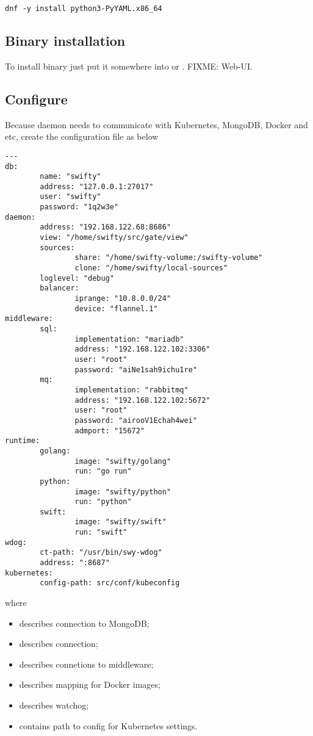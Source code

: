 \begin{lstlisting}
dnf -y install python3-PyYAML.x86_64
\end{lstlisting}

\subsection{Binary installation}
\label{subsec:setup-swifty-bin}

To install binary just put it somewhere into 
or . FIXME: Web-UI.

\subsection{Configure}
\label{subsec:setup-swifty-conf}

Because  daemon needs to communicate with Kubernetes,
MongoDB, Docker and etc, create the 
configuration file as below

\begin{lstlisting}
---
db:
        name: "swifty"
        address: "127.0.0.1:27017"
        user: "swifty"
        password: "1q2w3e"
daemon:
        address: "192.168.122.68:8686"
        view: "/home/swifty/src/gate/view"
        sources:
                share: "/home/swifty-volume:/swifty-volume"
                clone: "/home/swifty/local-sources"
        loglevel: "debug"
        balancer:
                iprange: "10.8.0.0/24"
                device: "flannel.1"
middleware:
        sql:
                implementation: "mariadb"
                address: "192.168.122.102:3306"
                user: "root"
                password: "aiNe1sah9ichu1re"
        mq:
                implementation: "rabbitmq"
                address: "192.168.122.102:5672"
                user: "root"
                password: "airooV1Echah4wei"
                admport: "15672"
runtime:
        golang:
                image: "swifty/golang"
                run: "go run"
        python:
                image: "swifty/python"
                run: "python"
        swift:
                image: "swifty/swift"
                run: "swift"
wdog:
        ct-path: "/usr/bin/swy-wdog"
        address: ":8687"
kubernetes:
        config-path: src/conf/kubeconfig
\end{lstlisting}

where
\begin{itemize}
\item{ describes connection to MongoDB;}
\item{ describes  connection;}
\item{ describes connetions to middleware;}
\item{ describes mapping for Docker images;}
\item{ describes  watchog;}
\item{ contains path to config for Kubernetes settings.}
\end{itemize}

